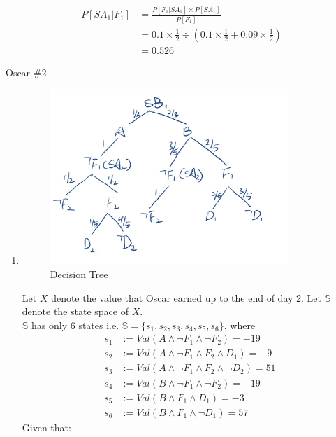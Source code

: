 \documentclass[11pt]{article}
\theoremstyle{definition}
\begin{document}
\begin{enumerate}[leftmargin=0pt, itemsep=3ex]
\begin{enumerate}
    \begin{align*}
        P[SA_1|F_1] &= \frac{P[F_1|SA_1] \times P[SA_1]}{P[F_1]}
        \\ &= 0.1 \times \frac{1}{2} \div (0.1 \times \frac{1}{2} + 0.09 \times \frac{1}{2})
        \\ &=0.526
    \end{align*}



    \end{enumerate}


    

    \problemitem Oscar \#2
    
    \begin{enumerate}[leftmargin=0pt, itemsep=3ex]
        \item 
        \begin{figure}[ht!]
            \centering
            \includegraphics[width=90mm]{images/image1.jpg}
            \caption{Decision Tree \label{overflow}}
            \end{figure}
            Let $X$ denote the value that Oscar earned up to the end of day 2. Let $\mathbb{S}$ denote the state space of $X$. 
            \\$\mathbb{S}$ has only $6$ states i.e. $\mathbb{S} = \{s_1, s_2, s_3, s_4, s_5, s_6\}$, where 
            \begin{align*}
                s_1 &:= Val(A \land \neg F_1 \land \neg F_2) = -19
                \\ s_2 &:= Val(A \land \neg F_1 \land F_2 \land D_1) = -9
                \\ s_3 &:= Val(A \land \neg F_1 \land F_2 \land \neg D_2) = 51
                \\ s_4 &:= Val(B \land \neg F_1 \land \neg F_2) = -19
                \\ s_5 &:= Val(B \land F_1 \land D_1) = -3
                \\ s_6 &:= Val(B \land F_1 \land \neg D_1) = 57
            \end{align*}
            Given that:
            

\end{enumerate}
\end{enumerate}
\end{document}

